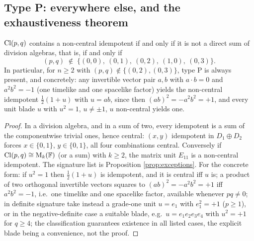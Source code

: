 \subsection{Type P: everywhere else, and the exhaustiveness theorem}

\begin{proposition}\label{prop:typeP}
$\mathrm{Cl}(p,q)$ contains a non-central idempotent if and only if it is not a direct sum of division algebras, that is, if and only if
\[
(p,q) \;\notin\; \{(0,0),\ (0,1),\ (0,2),\ (1,0),\ (0,3)\} .
\]
In particular, for $n \geq 2$ with $(p,q) \notin \{(0,2), (0,3)\}$, type P is always present, and concretely: any invertible vector pair $a, b$ with $a \cdot b = 0$ and $a^2 b^2 = -1$ (one timelike and one spacelike factor) yields the non-central idempotent $\tfrac12(1 + u)$ with $u = ab$, since then $(ab)^2 = -a^2b^2 = +1$, and every unit blade $u$ with $u^2 = 1$, $u \neq \pm 1$, $u$ non-central yields one.
\end{proposition}

\begin{proof}
In a division algebra, and in a sum of two, every idempotent is a sum of the componentwise trivial ones, hence central: $(x,y)$ idempotent in $D_1 \oplus D_2$ forces $x \in \{0,1\}$, $y \in \{0,1\}$, all four combinations central. Conversely if $\mathrm{Cl}(p,q) \cong \mathrm{M}_k(\mathbb{F})$ (or a sum) with $k \geq 2$, the matrix unit $E_{11}$ is a non-central idempotent. The signature list is Proposition \ref{prop:exceptions}. For the concrete form: if $u^2 = 1$ then $\tfrac12(1+u)$ is idempotent, and it is central iff $u$ is; a product of two orthogonal invertible vectors squares to $(ab)^2 = -a^2b^2 = +1$ iff $a^2 b^2 = -1$, i.e.\ one timelike and one spacelike factor, available whenever $pq \neq 0$; in definite signature take instead a grade-one unit $u = e_1$ with $e_1^2 = +1$ ($p \geq 1$), or in the negative-definite case a suitable blade, e.g.\ $u = e_1e_2e_3e_4$ with $u^2 = +1$ for $q \geq 4$; the classification guarantees existence in all listed cases, the explicit blade being a convenience, not the proof.
\end{proof}

